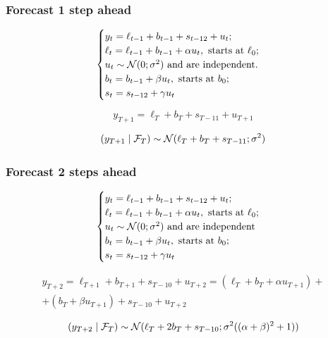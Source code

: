 \begin{frame}
	\frametitle{Forecast 1 step ahead}
	
	\[
	\begin{cases}
		y_t = \ell_{t-1} + b_{t-1} + s_{t-12} + u_t; \\
		\ell_t = \ell_{t-1} + b_{t-1} + \alpha u_t, \text{ starts at } \ell_0; \\
		u_t \sim \mathcal{N}(0;\sigma^2) \text{ and are independent.} \\
		b_t = b_{t-1} + \beta u_t,\text{ starts at } b_0; \\
		s_t = s_{t-12} + \gamma u_t
	\end{cases}
	\]
	
	\[
	y_{T+1} = \ell_T + b_T + s_{T-11} + u_{T+1}
	\]
	
	\[
	(y_{T+1} \mid \mathcal F_T) \sim \mathcal{N}(\ell_T + b_T + s_{T-11}; \sigma^2)
	\]
	
\end{frame}


\begin{frame}
	\frametitle{Forecast 2 steps ahead}
	
	\[
	\begin{cases}
		y_t = \ell_{t-1} + b_{t-1} + s_{t-12} + u_t; \\
		\ell_t = \ell_{t-1} + b_{t-1} + \alpha u_t, \text{ starts at } \ell_0; \\
		u_t \sim \mathcal{N}(0;\sigma^2) \text{ and are independent} \\
		b_t = b_{t-1} + \beta u_t,\text{ starts at } b_0; \\
		s_t = s_{t-12} + \gamma u_t
	\end{cases}
	\]
	
	\begin{multline*}
		y_{T+2} = \ell_{T+1} + b_{T+1} + s_{T-10} + u_{T+2} = (\ell_T + b_T + \alpha u_{T+1} ) +\\
		+ (b_T + \beta u_{T+1}) + s_{T-10} + u_{T+2}
	\end{multline*}
	
	\[
	(y_{T+2} \mid \mathcal F_T) \sim \mathcal{N}(\ell_T + 2b_T + s_{T-10}; \sigma^2((\alpha + \beta)^2 + 1))
	\]
	
\end{frame}




